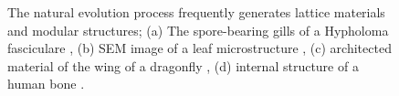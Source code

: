\begin{figure}
    \hfill
    \bigskip
    \hfill
    \caption{The natural evolution process frequently generates lattice materials and modular structures; (a) The spore-bearing gills of a Hypholoma fasciculare \cite{nz_hypholoma_2023}, (b) SEM image of a leaf microstructure \cite{library_leaf_nodate}, (c) architected material of the wing of a dragonfly \cite{gripspix_mostly_off_health_issues_wing_2007}, (d) internal structure of a human bone \cite{noauthor_bone_03_nodate}.}
    \label{fig:02_nature}
\end{figure}

